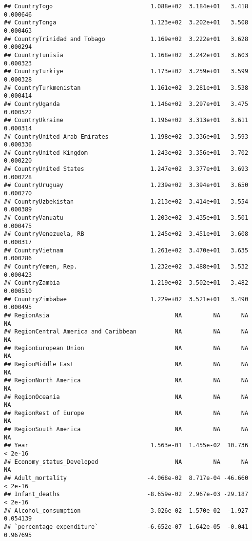 \documentclass[
]{article}
\begin{document}
\begin{verbatim}
## CountryTogo                            1.088e+02  3.184e+01   3.418 0.000646
## CountryTonga                           1.123e+02  3.202e+01   3.508 0.000463
## CountryTrinidad and Tobago             1.169e+02  3.222e+01   3.628 0.000294
## CountryTunisia                         1.168e+02  3.242e+01   3.603 0.000323
## CountryTurkiye                         1.173e+02  3.259e+01   3.599 0.000328
## CountryTurkmenistan                    1.161e+02  3.281e+01   3.538 0.000414
## CountryUganda                          1.146e+02  3.297e+01   3.475 0.000522
## CountryUkraine                         1.196e+02  3.313e+01   3.611 0.000314
## CountryUnited Arab Emirates            1.198e+02  3.336e+01   3.593 0.000336
## CountryUnited Kingdom                  1.243e+02  3.356e+01   3.702 0.000220
## CountryUnited States                   1.247e+02  3.377e+01   3.693 0.000228
## CountryUruguay                         1.239e+02  3.394e+01   3.650 0.000270
## CountryUzbekistan                      1.213e+02  3.414e+01   3.554 0.000389
## CountryVanuatu                         1.203e+02  3.435e+01   3.501 0.000475
## CountryVenezuela, RB                   1.245e+02  3.451e+01   3.608 0.000317
## CountryVietnam                         1.261e+02  3.470e+01   3.635 0.000286
## CountryYemen, Rep.                     1.232e+02  3.488e+01   3.532 0.000423
## CountryZambia                          1.219e+02  3.502e+01   3.482 0.000510
## CountryZimbabwe                        1.229e+02  3.521e+01   3.490 0.000495
## RegionAsia                                    NA         NA      NA       NA
## RegionCentral America and Caribbean           NA         NA      NA       NA
## RegionEuropean Union                          NA         NA      NA       NA
## RegionMiddle East                             NA         NA      NA       NA
## RegionNorth America                           NA         NA      NA       NA
## RegionOceania                                 NA         NA      NA       NA
## RegionRest of Europe                          NA         NA      NA       NA
## RegionSouth America                           NA         NA      NA       NA
## Year                                   1.563e-01  1.455e-02  10.736  < 2e-16
## Economy_status_Developed                      NA         NA      NA       NA
## Adult_mortality                       -4.068e-02  8.717e-04 -46.660  < 2e-16
## Infant_deaths                         -8.659e-02  2.967e-03 -29.187  < 2e-16
## Alcohol_consumption                   -3.026e-02  1.570e-02  -1.927 0.054139
## `percentage expenditure`              -6.652e-07  1.642e-05  -0.041 0.967695

\end{verbatim}
\end{document}
